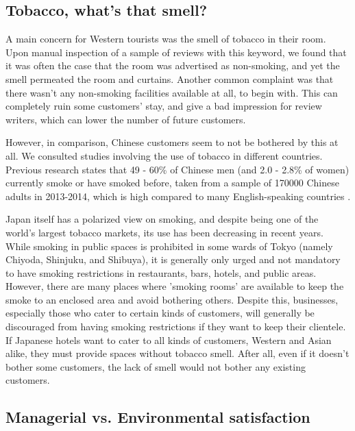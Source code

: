 \subsection{Tobacco, what's that smell?}\label{disc:tobacco}

A main concern for Western tourists was the smell of tobacco in their room. Upon manual inspection of a sample of reviews with this keyword, we found that it was often the case that the room was advertised as non-smoking, and yet the smell permeated the room and curtains. Another common complaint was that there wasn't any non-smoking facilities available at all, to begin with. This can completely ruin some customers' stay, and give a bad impression for review writers, which can lower the number of future customers.

However, in comparison, Chinese customers seem to not be bothered by this at all. We consulted studies involving the use of tobacco in different countries. Previous research states that 49 - 60\% of Chinese men (and 2.0 - 2.8\% of women) currently smoke or have smoked before, taken from a sample of \num[group-separator={,}]{170000} Chinese adults in 2013-2014, which is high compared to many English-speaking countries \cite[][]{zhang2019tobacco, who2015tobacco}.

Japan itself has a polarized view on smoking, and despite being one of the world's largest tobacco markets, its use has been decreasing in recent years. While smoking in public spaces is prohibited in some wards of Tokyo (namely Chiyoda, Shinjuku, and Shibuya), it is generally only urged and not mandatory to have smoking restrictions in restaurants, bars, hotels, and public areas. However, there are many places where 'smoking rooms' are available to keep the smoke to an enclosed area and avoid bothering others. Despite this, businesses, especially those who cater to certain kinds of customers, will generally be discouraged from having smoking restrictions if they want to keep their clientele. If Japanese hotels want to cater to all kinds of customers, Western and Asian alike, they must provide spaces without tobacco smell. After all, even if it doesn't bother some customers, the lack of smell would not bother any existing customers. 

\subsection{Managerial vs. Environmental satisfaction}\label{disc:hyp3}

